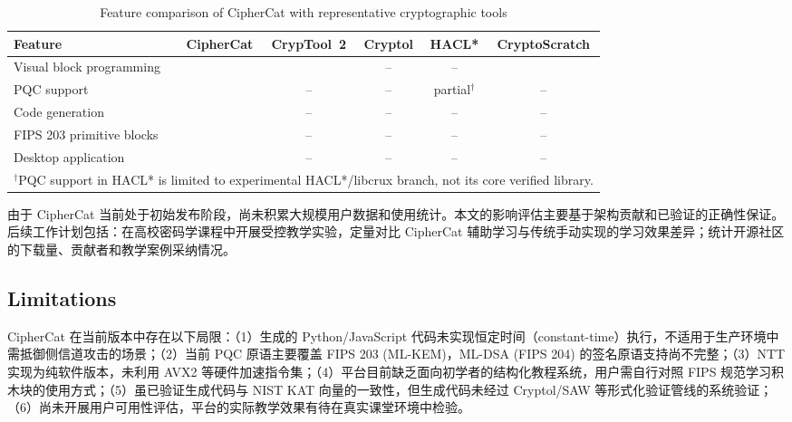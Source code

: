 \documentclass[preprint,12pt,a4paper]{elsarticle}
\begin{document}
\begin{table}[htbp]
	\centering
	\footnotesize
	\caption{Feature comparison of CipherCat with representative cryptographic tools}
	\label{tab:comparison}
	\begin{tabular}{|p{2.8cm}|c|c|c|c|c|}
		\hline
		\textbf{Feature}          & \textbf{CipherCat} & \textbf{CrypTool~2} & \textbf{Cryptol} & \textbf{HACL*}      & \textbf{CryptoScratch}             \\
		\hline
		Visual block programming  & \checkmark         & \checkmark          & --               & --                  & \checkmark                         \\
		\hline
		PQC support               & \checkmark         & --                  & --               & partial$^{\dagger}$ & --                                 \\
		\hline
		Code generation           & \checkmark         & --                  & --               & --                  & --                                 \\
		\hline
		FIPS 203 primitive blocks & \checkmark         & --                  & --               & --                  & --                                 \\
		\hline
		Desktop application       & \checkmark         & --                  & --               & --                  & --                                 \\
		\hline
		\multicolumn{6}{l}{\footnotesize $^{\dagger}$PQC support in HACL* is limited to experimental HACL*/libcrux branch, not its core verified library.} \\
	\end{tabular}
\end{table}



\medskip
由于 CipherCat 当前处于初始发布阶段，尚未积累大规模用户数据和使用统计。本文的影响评估主要基于架构贡献和已验证的正确性保证。后续工作计划包括：在高校密码学课程中开展受控教学实验，定量对比 CipherCat 辅助学习与传统手动实现的学习效果差异；统计开源社区的下载量、贡献者和教学案例采纳情况。

\subsection*{Limitations}

CipherCat 在当前版本中存在以下局限：（1）生成的 Python/JavaScript 代码未实现恒定时间（constant-time）执行，不适用于生产环境中需抵御侧信道攻击的场景；（2）当前 PQC 原语主要覆盖 FIPS 203 (ML-KEM)，ML-DSA (FIPS 204) 的签名原语支持尚不完整；（3）NTT 实现为纯软件版本，未利用 AVX2 等硬件加速指令集；（4）平台目前缺乏面向初学者的结构化教程系统，用户需自行对照 FIPS 规范学习积木块的使用方式；（5）虽已验证生成代码与 NIST KAT 向量的一致性，但生成代码未经过 Cryptol/SAW 等形式化验证管线的系统验证；（6）尚未开展用户可用性评估，平台的实际教学效果有待在真实课堂环境中检验。
\end{document}
